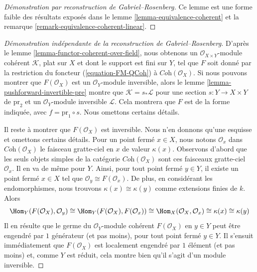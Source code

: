 \begin{proof}[Démonstration par reconstruction de Gabriel--Rosenberg]
Ce lemme est une forme faible des résultats exposés dans le
lemme \ref{lemma-equivalence-coherent} et la
remarque \ref{remark-equivalence-coherent-linear}.
\end{proof}

\begin{proof}[Démonstration indépendante de la reconstruction de Gabriel--Rosenberg]
D'après le lemme \ref{lemma-functor-coherent-over-field}, nous obtenons un
$\mathcal{O}_{X \times Y}$-module cohérent $\mathcal{K}$, plat sur $X$ et
dont le support est fini sur $Y$, tel que $F$ soit donné par la restriction
du foncteur (\ref{equation-FM-QCoh}) à $\textit{Coh}(\mathcal{O}_X)$.
Si nous pouvons montrer que $F(\mathcal{O}_X)$ est un
$\mathcal{O}_Y$-module inversible, alors le
lemme \ref{lemma-pushforward-invertible-pre} montre que
$\mathcal{K} = s_*\mathcal{L}$ pour une section
$s : Y \to X \times Y$ de $\text{pr}_2$ et un
$\mathcal{O}_Y$-module inversible $\mathcal{L}$.
Cela montrera que $F$ est de la forme indiquée, avec
$f = \text{pr}_1 \circ s$. Nous omettons certains détails.

\medskip\noindent
Il reste à montrer que $F(\mathcal{O}_X)$ est inversible. Nous n'en donnons
qu'une esquisse et omettons certains détails.
Pour un point fermé $x \in X$, nous notons $\mathcal{O}_x$ dans
$\textit{Coh}(\mathcal{O}_X)$ le faisceau gratte-ciel en $x$ de valeur
$\kappa(x)$. Observons d'abord que les seuls objets simples de la catégorie
$\textit{Coh}(\mathcal{O}_X)$ sont ces faisceaux gratte-ciel
$\mathcal{O}_x$. Il en va de même pour $Y$. Ainsi, pour tout point fermé
$y \in Y$, il existe un point fermé $x \in X$ tel que
$\mathcal{O}_y \cong F(\mathcal{O}_x)$. De plus, en considérant les
endomorphismes, nous trouvons $\kappa(x) \cong \kappa(y)$ comme extensions
finies de $k$. Alors
$$
\Hom_Y(F(\mathcal{O}_X), \mathcal{O}_y) \cong
\Hom_Y(F(\mathcal{O}_X), F(\mathcal{O}_x)) \cong
\Hom_X(\mathcal{O}_X, \mathcal{O}_x) \cong \kappa(x) \cong \kappa(y)
$$
Il en résulte que le germe du $\mathcal{O}_Y$-module cohérent
$F(\mathcal{O}_X)$ en $y \in Y$ peut être engendré par $1$ générateur (et
pas moins), pour tout point fermé $y \in Y$. Il s'ensuit immédiatement que
$F(\mathcal{O}_X)$ est localement engendré par $1$ élément (et pas moins) et,
comme $Y$ est réduit, cela montre bien qu'il s'agit d'un module inversible.
\end{proof}















